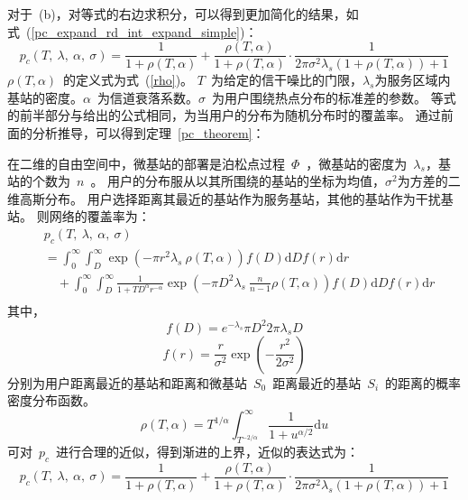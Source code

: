 对于~(b)，对等式的右边求积分，可以得到更加简化的结果，如式~(\ref{pc_expand_rd_int_expand_simple})：
\begin{equation}\label{pc_expand_rd_int_expand_simple}
p_c(T,~\lambda,~\alpha,~\sigma) = \frac{1}{1+\rho(T,\alpha)} + \frac{\rho(T,\alpha)}{1+\rho(T,\alpha)}\cdot\frac{1}{2\pi\sigma^2\lambda_s(1+\rho(T,\alpha))+1}
\end{equation}
$\rho(T,\alpha)$~的定义式为式~(\ref{rho})。
$T$~为给定的信干噪比的门限，$\lambda_s$为服务区域内基站的密度。$\alpha$~为信道衰落系数。$\sigma$~为用户围绕热点分布的标准差的参数。
等式的前半部分与\cite{ATractable}给出的公式相同，为当用户的分布为随机分布时的覆盖率。
通过前面的分析推导，可以得到定理~\ref{pc_theorem}：
\begin{theorem}\label{pc_theorem}
  在二维的自由空间中，微基站的部署是泊松点过程~$\Phi$~，微基站的密度为~$\lambda_s$，基站的个数为~$n$~。
  用户的分布服从以其所围绕的基站的坐标为均值，$\sigma^2$为方差的二维高斯分布。
  用户选择距离其最近的基站作为服务基站，其他的基站作为干扰基站。
  则网络的覆盖率为：
  \begin{equation}
    \begin{aligned}\label{pc_expand_rd_int_expand_complex}
    &p_c(T,~\lambda,~\alpha,~\sigma)\\
    &{=}\int_0^\infty  \int_D^{\infty}   \exp\left(-\pi r^2\lambda_s\  \rho(T,\alpha)  \right) f(D)    \mathrm{d} D f(r) \mathrm{d} r\\
    & \quad + \int_0^\infty  \int_D^{\infty}   \frac{1}{1+ T D ^\alpha r^{-\alpha}} \exp\left(-\pi D ^2 \lambda_s\ \frac{n}{n-1} \rho(T,\alpha)\right) f(D)    \mathrm{d} D f(r) \mathrm{d} r\\
    \end{aligned}
  \end{equation}
  其中，
  \begin{equation}
    f(D) = e^{-\lambda_s}\pi D^2 2 \pi \lambda_s D
  \end{equation}
  \begin{equation}
    f(r) = \frac{r}{\sigma^2}\exp(-\frac{r^2}{2\sigma^2})
  \end{equation}
  分别为用户距离最近的基站和距离和微基站~$S_0$~距离最近的基站~$S_i$~的距离的概率密度分布函数。
  \begin{equation}\label{rho}
    \rho(T,\alpha) = T ^{1/\alpha} \int_{T^{-2/\alpha}}^{\infty} \frac{1}{1+u^{\alpha/2}}\mathrm{d}u
  \end{equation}
  可对~$p_c$~进行合理的近似，得到渐进的上界，近似的表达式为：
  \begin{equation}\label{pc_expand_rd_int_expand_simple}
  p_c(T,~\lambda,~\alpha,~\sigma) = \frac{1}{1+\rho(T,\alpha)} + \frac{\rho(T,\alpha)}{1+\rho(T,\alpha)}\cdot\frac{1}{2\pi\sigma^2\lambda_s(1+\rho(T,\alpha))+1}
  \end{equation}
\end{theorem}

